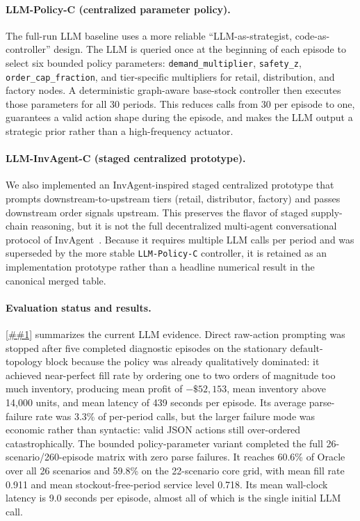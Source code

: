 \documentclass[10pt,a4paper]{article}
\providecommand{\Cref}[1]{\ref{##1}}
\begin{document}
\paragraph{LLM-Policy-C (centralized parameter policy).}
The full-run LLM baseline uses a more reliable
``LLM-as-strategist, code-as-controller'' design. The LLM is queried
once at the beginning of each episode to select six bounded policy
parameters: \texttt{demand\_multiplier}, \texttt{safety\_z},
\texttt{order\_cap\_fraction}, and tier-specific multipliers for
retail, distribution, and factory nodes. A deterministic graph-aware
base-stock controller then executes those parameters for all 30 periods.
This reduces calls from 30 per episode to one, guarantees a valid action
shape during the episode, and makes the LLM output a strategic prior
rather than a high-frequency actuator.

\paragraph{LLM-InvAgent-C (staged centralized prototype).}
We also implemented an InvAgent-inspired staged centralized prototype
that prompts downstream-to-upstream tiers (retail, distributor, factory)
and passes downstream order signals upstream. This preserves the flavor
of staged supply-chain reasoning, but it is not the full decentralized
multi-agent conversational protocol of InvAgent~\citep{quan2024}. Because
it requires multiple LLM calls per period and was superseded by the
more stable \texttt{LLM-Policy-C} controller, it is retained as an
implementation prototype rather than a headline numerical result in the
canonical merged table.

\paragraph{Evaluation status and results.}
\Cref{tab:llm_diagnostics} summarizes the current LLM evidence. Direct
raw-action prompting was stopped after five completed diagnostic
episodes on the stationary default-topology block because the policy
was already qualitatively dominated: it achieved near-perfect fill rate
by ordering one to two orders of magnitude too much inventory, producing
mean profit of \(-\$52{,}153\), mean inventory above 14{,}000 units,
and mean latency of 439 seconds per episode. Its average parse-failure
rate was 3.3\% of per-period calls, but the larger failure mode was
economic rather than syntactic: valid JSON actions still over-ordered
catastrophically. The bounded policy-parameter variant completed the full
26-scenario/260-episode matrix with zero parse failures. It reaches
60.6\% of Oracle over all 26 scenarios and 59.8\% on the 22-scenario
core grid, with mean fill rate 0.911 and mean stockout-free-period
service level 0.718. Its mean wall-clock latency is 9.0 seconds per
episode, almost all of which is the single initial LLM call.
\end{document}
